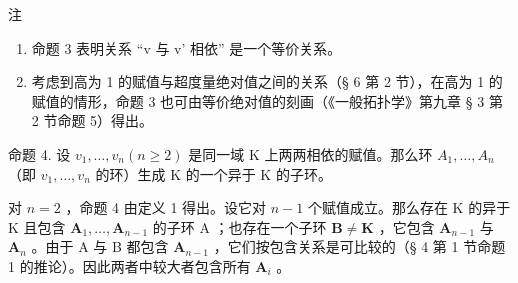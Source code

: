 注

\begin{enumerate}
\def\labelenumi{(\arabic{enumi})}
\item
  命题 3 表明关系 ``v 与 v' 相依'' 是一个等价关系。
\item
  考虑到高为 1 的赋值与超度量绝对值之间的关系（§ 6 第 2 节），在高为 1 的赋值的情形，命题 3 也可由等价绝对值的刻画（《一般拓扑学》第九章 § 3 第 2 节命题 5）得出。
\end{enumerate}

命题 4. 设 \(v_{1}, \ldots, v_{n} (n \geqslant 2)\) 是同一域 K 上两两相依的赋值。那么环 \(A_{1}, \ldots, A_{n}\) （即 \(v_{1}, \ldots, v_{n}\) 的环）生成 K 的一个异于 K 的子环。

对 \(n = 2\) ，命题 4 由定义 1 得出。设它对 \(n - 1\) 个赋值成立。那么存在 K 的异于 K 且包含 \(\mathbf{A}_1, \ldots, \mathbf{A}_{n-1}\) 的子环 A ；也存在一个子环 \(\mathbf{B} \neq \mathbf{K}\) ，它包含 \(\mathbf{A}_{n-1}\) 与 \(\mathbf{A}_n\) 。由于 A 与 B 都包含 \(\mathbf{A}_{n-1}\) ，它们按包含关系是可比较的（§ 4 第 1 节命题 1 的推论）。因此两者中较大者包含所有 \(\mathbf{A}_i\) 。

